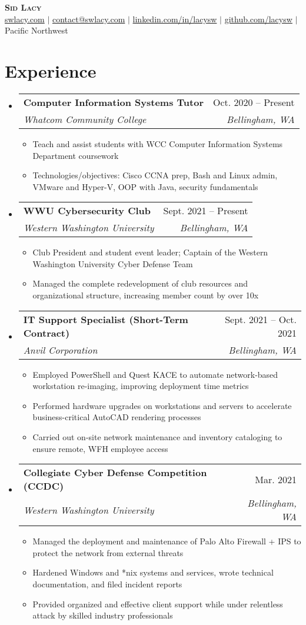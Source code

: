 \documentclass[10pt]{article}
\makeatletter
\newcommand{\resumeItem}[1]{
  \item\small{
    {#1 \vspace{-2pt}}
  }
}
\newcommand{\resumeSubheading}[4]{
  \vspace{2pt}\item
    \begin{tabular*}{0.97\textwidth}[t]{l@{\extracolsep{\fill}}r}
      \textbf{#1} & #2 \\
      \textit{\small#3} & \textit{\small #4} \\
    \end{tabular*}\vspace{-7pt}
}
\newcommand{\resumeSubHeadingListStart}{\begin{itemize}[leftmargin=0.15in, label={}]}
\newcommand{\resumeSubHeadingListEnd}{\end{itemize}}
\newcommand{\resumeItemListStart}{\begin{itemize}}
\newcommand{\resumeItemListEnd}{\end{itemize}\vspace{-5pt}}
\makeatother
\begin{document}
\begin{center}
    \textbf{\Huge \scshape Sid Lacy} \\ \vspace{4pt}
    \href{https://swlacy.com}{\faGlobe\enspace swlacy.com} $|$
    \href{mailto:contact@swlacy.com}{\faEnvelopeO\enspace contact@swlacy.com} $|$ 
    \href{https://linkedin.com/in/lacysw}{\faLinkedin\enspace linkedin.com/in/lacysw} $|$
    \href{https://github.com/lacysw}{\faGithub\enspace github.com/lacysw} $|$
    \faMapMarker\enspace Pacific Northwest
\end{center}

\section{Experience}
  \resumeSubHeadingListStart
    \resumeSubheading
      {Computer Information Systems Tutor}{Oct. 2020 -- Present}
      {Whatcom Community College}{Bellingham, WA}
      \resumeItemListStart
        \resumeItem{Teach and assist students with WCC Computer Information Systems Department coursework}
        \resumeItem{Technologies/objectives: Cisco CCNA prep, Bash and Linux admin, VMware and Hyper-V, OOP with Java, security fundamentals}
      \resumeItemListEnd
    
    \resumeSubheading
      {WWU Cybersecurity Club}{Sept. 2021 -- Present}
      {Western Washington University}{Bellingham, WA}
      \resumeItemListStart
        \resumeItem{Club President and student event leader; Captain of the Western Washington University Cyber Defense Team}
        \resumeItem{Managed the complete redevelopment of club resources and organizational structure, increasing member count by over 10x}
      \resumeItemListEnd
      
    \resumeSubheading
      {IT Support Specialist (Short-Term Contract)}{Sept. 2021 -- Oct. 2021}
      {Anvil Corporation}{Bellingham, WA}
      \resumeItemListStart
        \resumeItem{Employed PowerShell and Quest KACE to automate network-based workstation re-imaging, improving deployment time metrics}
        \resumeItem{Performed hardware upgrades on workstations and servers to accelerate business-critical AutoCAD rendering processes}
        \resumeItem{Carried out on-site network maintenance and inventory cataloging to ensure remote, WFH employee access}
      \resumeItemListEnd

     \resumeSubheading
      {Collegiate Cyber Defense Competition (CCDC)}{Mar. 2021}
      {Western Washington University}{Bellingham, WA}
      \resumeItemListStart
        \resumeItem{Managed the deployment and maintenance of Palo Alto Firewall + IPS to protect the network from external threats}
        \resumeItem{Hardened Windows and *nix systems and services, wrote technical documentation, and filed incident reports}
        \resumeItem{Provided organized and effective client support while under relentless attack by skilled industry professionals}
      \resumeItemListEnd
  \resumeSubHeadingListEnd
\end{document}
